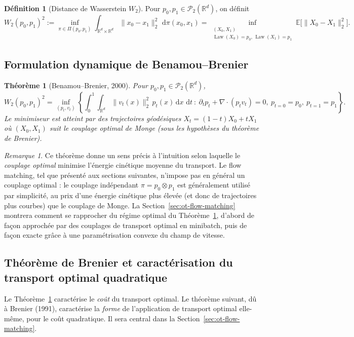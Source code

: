 \documentclass[11pt,a4paper]{article}
\theoremstyle{definition}
\newtheorem{definition}{Définition}[section]
\theoremstyle{plain}
\newtheorem{theoreme}{Théorème}[section]
\theoremstyle{remark}
\newtheorem{remark}{Remarque}[section]
\newcommand{\R}{\mathbb{R}}
\newcommand{\E}{\mathbb{E}}
\newcommand{\dd}{\,\mathrm{d}}
\DeclareMathOperator{\Law}{Law}
\begin{document}
\begin{definition}[Distance de Wasserstein $W_2$]
Pour $p_0,p_1\in\mathcal{P}_2(\R^d)$, on définit
\[
  W_2(p_0,p_1)^2
  :=
  \inf_{\pi\in\Pi(p_0,p_1)}
  \int_{\R^d\times\R^d}\|x_0-x_1\|_2^2\,\dd\pi(x_0,x_1)
  =
  \inf_{\substack{(X_0,X_1)\\ \Law(X_0)=p_0,\,\Law(X_1)=p_1}}
  \E\bigl[\|X_0-X_1\|_2^2\bigr].
\]
\end{definition}

\subsection{Formulation dynamique de Benamou--Brenier}

\begin{theoreme}[Benamou--Brenier, 2000]\label{thm:BB}
Pour $p_0,p_1\in\mathcal{P}_2(\R^d)$,
\[
  W_2(p_0,p_1)^2
  =
  \inf_{(p_t,v_t)}
  \left\{
  \int_0^1\int_{\R^d}\|v_t(x)\|_2^2\,p_t(x)\dd x\,\dd t
  \ :\
  \partial_t p_t+\nabla\cdot(p_tv_t)=0,\ p_{t=0}=p_0,\ p_{t=1}=p_1
  \right\}.
\]
Le minimiseur est atteint par des trajectoires géodésiques
$X_t=(1-t)X_0+tX_1$ où $(X_0,X_1)$ suit le couplage optimal de Monge (sous les
hypothèses du théorème de Brenier).
\end{theoreme}

\begin{remark}\label{rem:BB-suboptimal}
Ce théorème donne un sens précis à l'intuition selon laquelle le
\emph{couplage optimal} minimise l'énergie cinétique moyenne du transport. Le
flow matching, tel que présenté aux sections suivantes, n'impose pas en général
un couplage optimal : le couplage indépendant $\pi=p_0\otimes p_1$ est
généralement utilisé par simplicité, au prix d'une énergie cinétique plus
élevée (et donc de trajectoires plus courbes) que le couplage de Monge. La
Section~\ref{sec:ot-flow-matching} montrera comment se rapprocher du régime
optimal du Théorème~\ref{thm:BB}, d'abord de façon approchée par des couplages
de transport optimal en minibatch, puis de façon exacte grâce à une
paramétrisation convexe du champ de vitesse.
\end{remark}

\subsection{Théorème de Brenier et caractérisation du transport optimal quadratique}

Le Théorème~\ref{thm:BB} caractérise le \emph{coût} du transport optimal. Le
théorème suivant, dû à Brenier (1991), caractérise la \emph{forme} de
l'application de transport optimal elle-même, pour le coût quadratique. Il sera
central dans la Section~\ref{sec:ot-flow-matching}.
\end{document}
